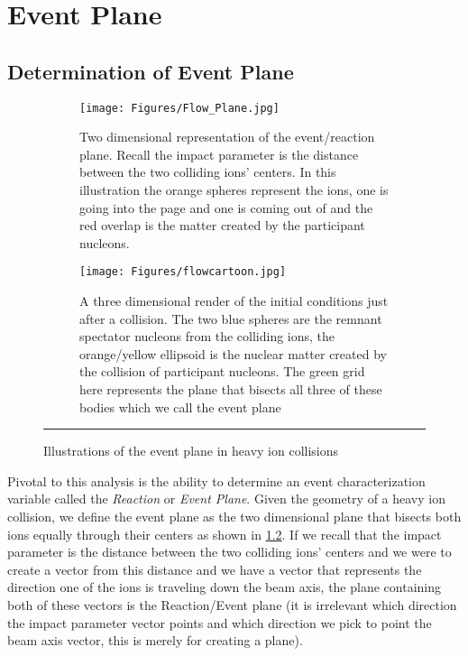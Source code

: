 
\chapter{Event Plane} %

\section{Determination of Event Plane}

\begin{figure}[htbp!]
  \centering
    \begin{subfigure}[p]{0.7\textwidth}
    \texttt{[image: Figures/Flow\_Plane.jpg]}
    \caption[Diagram showing impact parameter versus $N_spectators$ and $N_participants$]{Two dimensional representation of the event/reaction plane. Recall the impact parameter is the distance between the two colliding ions' centers. In this illustration the orange spheres represent the ions, one is going into the page and one is coming out of and the red overlap is the matter created by the participant nucleons.
    \label{fig:cernfireball}}
    \end{subfigure}
    \begin{subfigure}[p]{0.7\textwidth}
    \texttt{[image: Figures/flowcartoon.jpg]}
	\caption[Central vs Peripheral collisions, geometry of initial conditions]{A three dimensional render of the initial conditions just after a collision. The two blue spheres are the remnant spectator nucleons from the colliding ions, the orange/yellow ellipsoid is the nuclear matter created by the collision of participant nucleons. The green grid here represents the plane that bisects all three of these bodies which we call the event plane}
    \end{subfigure}
    \rule{35em}{0.5pt}
  \caption[Illustrations of the event plane in heavy ion collisions]{Illustrations of the event plane in heavy ion collisions}
  \label{fig:evtpln}
\end{figure}

Pivotal to this analysis is the ability to determine an event characterization variable called the \textit{Reaction} or \textit{Event Plane}. Given the geometry of a heavy ion collision, we define the event plane as the two dimensional plane that bisects both ions equally through their centers as shown in \ref{fig:evtpln}. If we recall that the impact parameter is the distance between the two colliding ions' centers and we were to create a vector from this distance and we have a vector that represents the direction one of the ions is traveling down the beam axis, the plane containing both of these vectors is the Reaction/Event plane (it is irrelevant which direction the impact parameter vector points and which direction we pick to point the beam axis vector, this is merely for creating a plane).

